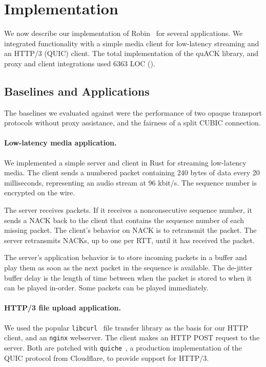 \section{Implementation}
\label{sec:implementation}



We now describe our implementation of Robin~\cite{sidekick-github} for several applications.
We integrated \sys functionality with a simple media client for low-latency streaming
and an HTTP/3 (QUIC) client.
The total implementation of the quACK library, and proxy and client
integrations used 6363 LOC ().


\subsection{Baselines and Applications}

The baselines we evaluated against were the performance of two opaque transport
protocols without proxy assistance, and the fairness of a split CUBIC connection.

\paragraph{Low-latency media application.}
We implemented a simple server and client in Rust for streaming low-latency
media. The client sends a numbered packet containing 240 bytes of data every
20 milliseconds, representing an audio stream at 96 kbit/s.
The sequence number is encrypted on the wire.

The server receives packets. If it receives a nonconsecutive sequence number,
it sends a NACK back to the client that contains the sequence number of each
missing packet. The client's behavior on NACK is to retransmit the packet. The
server retransmits NACKs, up to one per RTT, until it has received the packet.

The server's application behavior is to store incoming packets in a buffer
and play them as soon as the next packet in the sequence is available. The
de-jitter buffer delay is the length of time between when the packet is stored
to when it can be played in-order. Some packets can be played immediately.

\paragraph{HTTP/3 file upload application.}
We used the popular \texttt{libcurl}~\cite{libcurl} file transfer library as the basis for
our HTTP client, and an \texttt{nginx} webserver. The client makes an HTTP
POST request to the server. Both are patched with \texttt{quiche}~\cite{quiche}, a production
implementation of the QUIC protocol from Cloudflare, to provide support for
HTTP/3.

